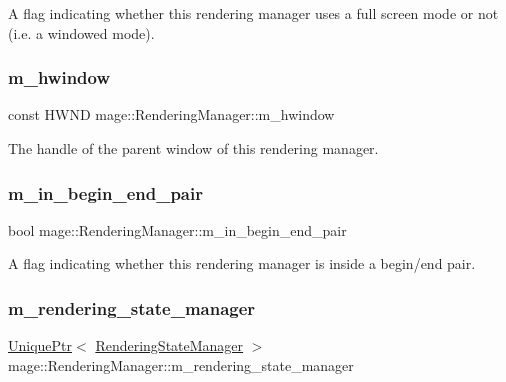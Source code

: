 A flag indicating whether this rendering manager uses a full screen mode or not (i.\+e. a windowed mode). \hypertarget{classmage_1_1_rendering_manager_a75a2ed9a4bac39c2b03960ceadd6c7dd}{}\label{classmage_1_1_rendering_manager_a75a2ed9a4bac39c2b03960ceadd6c7dd} 
\subsubsection{\texorpdfstring{m\+\_\+hwindow}{m\_hwindow}}
{\footnotesize\ttfamily const H\+W\+ND mage\+::\+Rendering\+Manager\+::m\+\_\+hwindow\hspace{0.3cm}{\ttfamily [private]}}

The handle of the parent window of this rendering manager. \hypertarget{classmage_1_1_rendering_manager_a1dd7c7cd125fd0962c013a190594c699}{}\label{classmage_1_1_rendering_manager_a1dd7c7cd125fd0962c013a190594c699} 
\subsubsection{\texorpdfstring{m\+\_\+in\+\_\+begin\+\_\+end\+\_\+pair}{m\_in\_begin\_end\_pair}}
{\footnotesize\ttfamily bool mage\+::\+Rendering\+Manager\+::m\+\_\+in\+\_\+begin\+\_\+end\+\_\+pair\hspace{0.3cm}{\ttfamily [private]}}

A flag indicating whether this rendering manager is inside a begin/end pair. \hypertarget{classmage_1_1_rendering_manager_aa31eab8068bf43e3b90f72644495c16a}{}\label{classmage_1_1_rendering_manager_aa31eab8068bf43e3b90f72644495c16a} 
\subsubsection{\texorpdfstring{m\+\_\+rendering\+\_\+state\+\_\+manager}{m\_rendering\_state\_manager}}
{\footnotesize\ttfamily \hyperlink{namespacemage_a3316d7143a973e37adf1110f2e80ca31}{Unique\+Ptr}$<$ \hyperlink{structmage_1_1_rendering_state_manager}{Rendering\+State\+Manager} $>$ mage\+::\+Rendering\+Manager\+::m\+\_\+rendering\+\_\+state\+\_\+manager\hspace{0.3cm}{\ttfamily [private]}}


